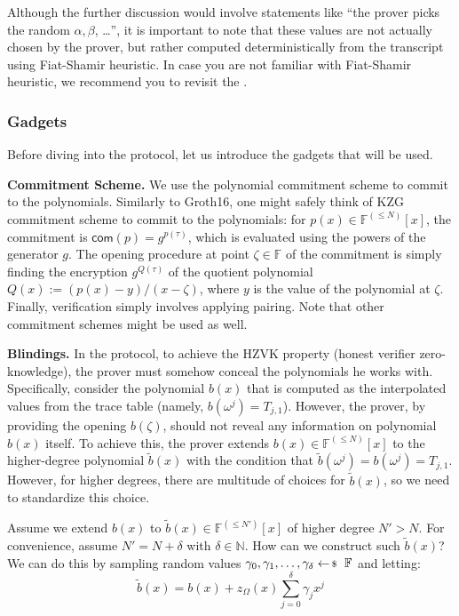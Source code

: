 \documentclass[../../book.tex]{subfiles}
\begin{document}
\begin{remark}
    Although the further discussion would involve statements like ``the prover
    picks the random $\alpha,\beta$, \ldots'', it is important to note that
    these values are not actually chosen by the prover, but rather computed
    deterministically from the transcript using Fiat-Shamir heuristic. In case 
    you are not familiar with Fiat-Shamir heuristic, we recommend you to revisit
    the .
\end{remark}

\subsubsection{Gadgets}

Before diving into the protocol, let us introduce the gadgets that will be used.

\textcolor{blue!60!black}{\textbf{Commitment Scheme.}} We use the polynomial
commitment scheme to commit to the polynomials. Similarly to Groth16, one might
safely think of KZG commitment scheme to commit to the polynomials: for $p(x)
\in \mathbb{F}^{(\leq N)}[x]$, the commitment is $\mathsf{com}(p) =
g^{p(\tau)}$, which is evaluated using the powers of the generator $g$. The
opening procedure at point $\zeta \in \mathbb{F}$ of the commitment is simply
finding the encryption $g^{Q(\tau)}$ of the quotient polynomial $Q(x) :=
(p(x)-y)/(x-\zeta)$, where $y$ is the value of the polynomial at $\zeta$.
Finally, verification simply involves applying pairing. Note that other
commitment schemes might be used as well.

\textcolor{blue!60!black}{\textbf{Blindings.}} In the protocol, to achieve 
the HZVK property (honest verifier zero-knowledge), the prover must somehow 
conceal the polynomials he works with. Specifically, consider the polynomial 
$b(x)$ that is computed as the interpolated values from the trace table (namely, 
$b(\omega^j) = T_{j,1}$). However, the prover, by providing the opening $b(\zeta)$,
should not reveal any information on polynomial $b(x)$ itself. To achieve this, the prover
extends $b(x) \in \mathbb{F}^{(\leq N)}[x]$ to the higher-degree polynomial $\widetilde{b}(x)$
with the condition that $\widetilde{b}(\omega^j) = b(\omega^j) = T_{j,1}$. However, for higher 
degrees, there are multitude of choices for $\widetilde{b}(x)$, so we need to standardize 
this choice. 

Assume we extend $b(x)$ to $\widetilde{b}(x) \in \mathbb{F}^{(\leq N')}[x]$ of
higher degree $N'>N$. For convenience, assume $N' = N + \delta$ with $\delta \in
\mathbb{N}$. How can we construct such $\widetilde{b}(x)$? We can do this by
sampling random values $\gamma_0,\gamma_1,\dots,\gamma_{\delta} \leftarrowS \mathbb{F}$ and 
letting:
\begin{equation*}
    \widetilde{b}(x) = b(x) + z_{\Omega}(x)\sum_{j=0}^{\delta}\gamma_jx^j
\end{equation*}
\end{document}
